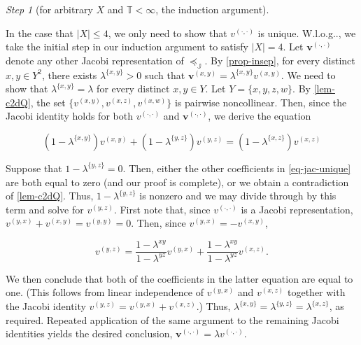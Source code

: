 \documentclass[ecta,nameyear,draft]{econsocart}
\makeatletter
\newcommand{\mbbt}{{\mathds {T}}}
\newcommand{\mbbj}{\mathds J}
\newcommand{\xy}{{(x, y)}}
\newcommand{\yx}{{(y, x)}}
\newcommand{\yz}{{(y,z)}}
\newcommand{\xz}{{(x,z)}}
\newcommand{\xw}{{(x,w)}}
\newcommand{\dd}{{(\cdot,\cdot)}}
\newcommand\Wlog{W\@.l\@.o\@.g\@ifnextchar.{}{.\@}}
\theoremstyle{plain}
\theoremstyle{remark}
\newtheorem{step}{Step}[section]
\makeatother
\begin{document}
\begin{appendix}
\begin{step}[for arbitrary $X$ and $\mbbt < \infty$, the induction
    argument]
\begin{proofEnd}
    In the case that $\lvert X \rvert \leq 4$, we only need to show that $v^{
      \dd}$ is unique. \Wlog, we take the initial step in our induction argument
    to satisfy $\lvert X \rvert = 4$.  Let $\mathbf v^{\dd}$ denote any other
    Jacobi representation of $\preceq_{\mbbj}$. By \cref{prop-insep}, for every
    distinct $x , y \in Y^{2}$, there exists $\lambda^{\{x,y\}}> 0$ such that
    $\mathbf v^{\xy} = \lambda^{\{x,y\}} v^{\xy}$. We need to show that
    $\lambda^{\{x,y\}} = \lambda$ for every distinct $x , y \in Y$.  Let $Y = \{
      x , y , z , w \}$.  By \cref{lem-c2dQ}, the set $\{v^{\xy} , v^{\xz}
    , v^{\xw} \}$ is pairwise noncollinear. Then, since the Jacobi identity
    holds for both $v^{\dd}$ and $\mathbf v^{\dd}$, we derive the equation
  \begin{linenomath*}
    \begin{equation}\label{eq-jac-unique}
      (1 - \lambda^{\{x,y\}})v^{\xy} + (1 - \lambda^{\{y,z\}})v^{\yz} =
      (1 - \lambda^{\{x,z\}}) v^{\xz}
    \end{equation}
  \end{linenomath*}
  Suppose that $1 - \lambda^{\{y,z\}} = 0$. Then, either the other coefficients
    in \cref{eq-jac-unique} are both equal to zero (and our proof is complete),
    or we obtain a contradiction of \cref{lem-c2dQ}.  Thus, $1 - \lambda
   ^{\{y,z\}}$ is nonzero and we may divide through by this term and solve for
    $v^{\yz}$. First note that, since $v^{\dd}$ is a Jacobi representation,
    $v^{\yx}+ v^{\xy} = v^{(y,y)} = 0$. Then, since $v^{\yx} = - v^{
      \xy}$, 
  \begin{linenomath*}
    \begin{equation*}
      v^{\yz} = \frac{1- \lambda^{x y}}{1 - \lambda^{y z}} v^{\yx} +
      \frac{1 - \lambda^{x y}}{1 - \lambda^{y z}} v^{\xz}.
    \end{equation*}
    \end{linenomath*}
  We then conclude that both of the coefficients in the latter equation are equal
    to one. (This follows from linear independence of $v^{\yx}$ and $v^{\xz
   }$ together with the Jacobi identity $v^{\yz} = v^{\yx} + v^{\xz}$.)
    Thus, $\lambda^{\{x,y\}} = \lambda^{\{y,z\}} = \lambda^{\{x,z\}}$, as
    required. Repeated application of the same argument to the remaining Jacobi
    identities yields the desired conclusion, $\mathbf v^{\dd}= \lambda v^{\dd}$.
  

\end{proofEnd}
\end{step}
\end{appendix}
\end{document}

